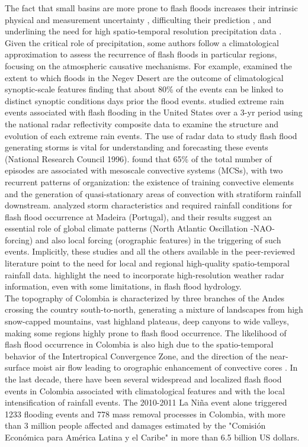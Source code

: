 \documentclass[hess, manuscript]{copernicus}
\begin{document}
The fact that small basins are more prone to flash floods increases their intrinsic physical and measurement uncertainty \citep{Wagener2007},  difficulting their prediction \citep{Hardy2016, Ruiz-Villanueva2013, Yamanaka2017,Borga2011, Marra2017}, and underlining the need for high spatio-temporal resolution precipitation data \citep{Norbiato2008}.  Given the critical role of precipitation, some authors follow a climatological approximation to assess the recurrence of flash floods in particular regions, focusing on the atmospheric causative mechanisms. For example, \citet{Kahana2002} examined the extent to which floods in the Negev Desert are the outcome of climatological synoptic-scale features finding that about 80\% of the events can be linked to distinct synoptic conditions days prior the flood events.  \citet{Schumacher2005} studied extreme rain events associated with flash flooding in the United States over a 3-yr period using the national radar reflectivity composite data to examine the structure and evolution of each extreme rain events. The use of radar data to study flash flood generating storms is vital for understanding and forecasting these events  (National Research Council 1996).  \citet{Schumacher2005}  found that 65\% of the total number of episodes are associated with mesoscale convective systems (MCSs), with two recurrent patterns of organization: the existence of training convective elements and the generation of quasi-stationary areas of convection with stratiform rainfall downstream.  \citet{Fragoso2012} analyzed storm characteristics and required rainfall conditions for flash flood occurrence at Madeira (Portugal), and their results suggest an essential role of global climate patterns (North Atlantic Oscillation -NAO- forcing) and also local forcing (orographic features) in the triggering of such events.  Implicitly, these studies and all the others available in the peer-reviewed literature point to the need for local and regional high-quality  spatio-temporal rainfall data. \citet{BERNE2013} highlight the need to incorporate high-resolution weather radar information, even with some limitations, in flash flood hydrology. \\

The topography of Colombia is characterized by three branches of the Andes crossing the country south-to-north, generating a mixture of landscapes from high snow-capped mountains, vast highland plateaus, deep canyons to wide valleys,  making some regions highly prone to flash flood occurrence. The likelihood of flash flood occurrence in Colombia is also high due to the spatio-temporal behavior of the Intertropical Convergence Zone, and the direction of the near-surface moist air flow leading to orographic enhancement of convective cores  \citep{Poveda2007}. In the last decade, there have been several widespread and localized flash flood events in Colombia associated with climatological features and with the local intensification of rainfall events.  The 2010-2011 La Niña event alone triggered 1233 flooding events and 778 mass removal processes in Colombia,  with more than 3 million people affected and damages estimated  by the "Comisión Económica para América Latina y el Caribe" in more than 6.5 billion US dollars.\\
\end{document}
